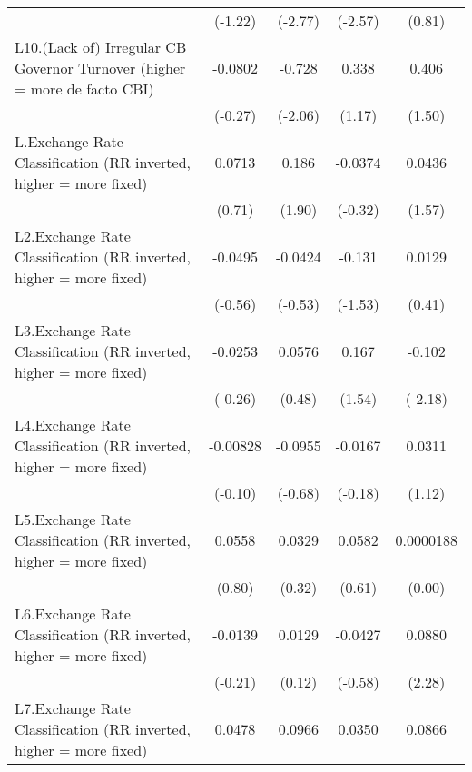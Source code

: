 {\begin{longtable}{l*{4}{c}}
                &  (-1.22)         &  (-2.77)         &  (-2.57)         &   (0.81)         \\
[1em]
L10.(Lack of) Irregular CB Governor Turnover (higher = more de facto CBI)&  -0.0802         &   -0.728\sym{*}  &    0.338         &    0.406         \\
                &  (-0.27)         &  (-2.06)         &   (1.17)         &   (1.50)         \\
[1em]
L.Exchange Rate Classification (RR inverted, higher = more fixed)&   0.0713         &    0.186         &  -0.0374         &   0.0436         \\
                &   (0.71)         &   (1.90)         &  (-0.32)         &   (1.57)         \\
[1em]
L2.Exchange Rate Classification (RR inverted, higher = more fixed)&  -0.0495         &  -0.0424         &   -0.131         &   0.0129         \\
                &  (-0.56)         &  (-0.53)         &  (-1.53)         &   (0.41)         \\
[1em]
L3.Exchange Rate Classification (RR inverted, higher = more fixed)&  -0.0253         &   0.0576         &    0.167         &   -0.102\sym{*}  \\
                &  (-0.26)         &   (0.48)         &   (1.54)         &  (-2.18)         \\
[1em]
L4.Exchange Rate Classification (RR inverted, higher = more fixed)& -0.00828         &  -0.0955         &  -0.0167         &   0.0311         \\
                &  (-0.10)         &  (-0.68)         &  (-0.18)         &   (1.12)         \\
[1em]
L5.Exchange Rate Classification (RR inverted, higher = more fixed)&   0.0558         &   0.0329         &   0.0582         &0.0000188         \\
                &   (0.80)         &   (0.32)         &   (0.61)         &   (0.00)         \\
[1em]
L6.Exchange Rate Classification (RR inverted, higher = more fixed)&  -0.0139         &   0.0129         &  -0.0427         &   0.0880\sym{*}  \\
                &  (-0.21)         &   (0.12)         &  (-0.58)         &   (2.28)         \\
[1em]
L7.Exchange Rate Classification (RR inverted, higher = more fixed)&   0.0478         &   0.0966         &   0.0350         &   0.0866         \\

\end{longtable}}
